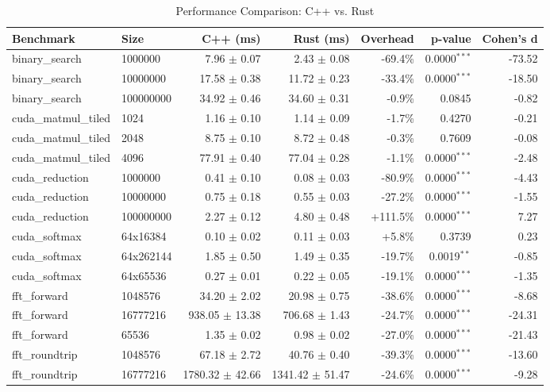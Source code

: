 \begin{table}[htbp]
\caption{Performance Comparison: C++ vs. Rust}
\label{tab:results}
\centering
\begin{tabular}{llrrrrr}
\toprule
Benchmark & Size & C++ (ms) & Rust (ms) & Overhead & p-value & Cohen's d \\
\midrule
binary_search & 1000000 & 7.96 $\pm$ 0.07 & 2.43 $\pm$ 0.08 & -69.4\% & 0.0000$^{***}$ & -73.52 \\
binary_search & 10000000 & 17.58 $\pm$ 0.38 & 11.72 $\pm$ 0.23 & -33.4\% & 0.0000$^{***}$ & -18.50 \\
binary_search & 100000000 & 34.92 $\pm$ 0.46 & 34.60 $\pm$ 0.31 & -0.9\% & 0.0845 & -0.82 \\
cuda_matmul_tiled & 1024 & 1.16 $\pm$ 0.10 & 1.14 $\pm$ 0.09 & -1.7\% & 0.4270 & -0.21 \\
cuda_matmul_tiled & 2048 & 8.75 $\pm$ 0.10 & 8.72 $\pm$ 0.48 & -0.3\% & 0.7609 & -0.08 \\
cuda_matmul_tiled & 4096 & 77.91 $\pm$ 0.40 & 77.04 $\pm$ 0.28 & -1.1\% & 0.0000$^{***}$ & -2.48 \\
cuda_reduction & 1000000 & 0.41 $\pm$ 0.10 & 0.08 $\pm$ 0.03 & -80.9\% & 0.0000$^{***}$ & -4.43 \\
cuda_reduction & 10000000 & 0.75 $\pm$ 0.18 & 0.55 $\pm$ 0.03 & -27.2\% & 0.0000$^{***}$ & -1.55 \\
cuda_reduction & 100000000 & 2.27 $\pm$ 0.12 & 4.80 $\pm$ 0.48 & +111.5\% & 0.0000$^{***}$ & 7.27 \\
cuda_softmax & 64x16384 & 0.10 $\pm$ 0.02 & 0.11 $\pm$ 0.03 & +5.8\% & 0.3739 & 0.23 \\
cuda_softmax & 64x262144 & 1.85 $\pm$ 0.50 & 1.49 $\pm$ 0.35 & -19.7\% & 0.0019$^{**}$ & -0.85 \\
cuda_softmax & 64x65536 & 0.27 $\pm$ 0.01 & 0.22 $\pm$ 0.05 & -19.1\% & 0.0000$^{***}$ & -1.35 \\
fft_forward & 1048576 & 34.20 $\pm$ 2.02 & 20.98 $\pm$ 0.75 & -38.6\% & 0.0000$^{***}$ & -8.68 \\
fft_forward & 16777216 & 938.05 $\pm$ 13.38 & 706.68 $\pm$ 1.43 & -24.7\% & 0.0000$^{***}$ & -24.31 \\
fft_forward & 65536 & 1.35 $\pm$ 0.02 & 0.98 $\pm$ 0.02 & -27.0\% & 0.0000$^{***}$ & -21.43 \\
fft_roundtrip & 1048576 & 67.18 $\pm$ 2.72 & 40.76 $\pm$ 0.40 & -39.3\% & 0.0000$^{***}$ & -13.60 \\
fft_roundtrip & 16777216 & 1780.32 $\pm$ 42.66 & 1341.42 $\pm$ 51.47 & -24.6\% & 0.0000$^{***}$ & -9.28 \\

\end{tabular}
\end{table}
